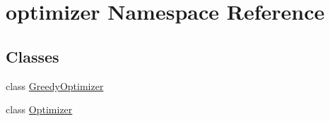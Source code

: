 \hypertarget{namespaceoptimizer}{}\section{optimizer Namespace Reference}
\label{namespaceoptimizer}
\subsection*{Classes}
\begin{DoxyCompactItemize}
\item 
class \mbox{\hyperlink{classoptimizer_1_1_greedy_optimizer}{Greedy\+Optimizer}}
\item 
class \mbox{\hyperlink{classoptimizer_1_1_optimizer}{Optimizer}}
\end{DoxyCompactItemize}
